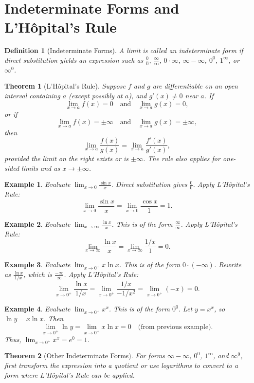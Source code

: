 \documentclass[11pt,a4paper]{article}
\newtheorem{example}{Example}
\newtheorem{theorem}{Theorem}
\newtheorem{definition}{Definition}
\begin{document}
\section{Indeterminate Forms and L'Hôpital's Rule}
\begin{definition}[Indeterminate Forms]
A limit is called an \textit{indeterminate form} if direct substitution yields an expression such as $\frac{0}{0}$, $\frac{\infty}{\infty}$, $0 \cdot \infty$, $\infty - \infty$, $0^0$, $1^\infty$, or $\infty^0$.
\end{definition}
\begin{theorem}[L'Hôpital's Rule]
Suppose $f$ and $g$ are differentiable on an open interval containing $a$ (except possibly at $a$), and $g'(x) \neq 0$ near $a$. If
\[
\lim_{x \to a} f(x) = 0 \quad \text{and} \quad \lim_{x \to a} g(x) = 0,
\]
or if
\[
\lim_{x \to a} f(x) = \pm\infty \quad \text{and} \quad \lim_{x \to a} g(x) = \pm\infty,
\]
then
\[
\lim_{x \to a} \frac{f(x)}{g(x)} = \lim_{x \to a} \frac{f'(x)}{g'(x)},
\]
provided the limit on the right exists or is $\pm\infty$. The rule also applies for one-sided limits and as $x \to \pm\infty$.
\end{theorem}
\begin{example}
Evaluate $\displaystyle \lim_{x \to 0} \frac{\sin x}{x}$.
Direct substitution gives $\frac{0}{0}$. Apply L'Hôpital's Rule:
\[
\lim_{x \to 0} \frac{\sin x}{x} = \lim_{x \to 0} \frac{\cos x}{1} = 1.
\]
\end{example}
\begin{example}
Evaluate $\displaystyle \lim_{x \to \infty} \frac{\ln x}{x}$.
This is of the form $\frac{\infty}{\infty}$. Apply L'Hôpital's Rule:
\[
\lim_{x \to \infty} \frac{\ln x}{x} = \lim_{x \to \infty} \frac{1/x}{1} = 0.
\]
\end{example}
\begin{example}
Evaluate $\displaystyle \lim_{x \to 0^+} x \ln x$.
This is of the form $0 \cdot (-\infty)$. Rewrite as $\frac{\ln x}{1/x}$, which is $\frac{-\infty}{\infty}$. Apply L'Hôpital's Rule:
\[
\lim_{x \to 0^+} \frac{\ln x}{1/x} = \lim_{x \to 0^+} \frac{1/x}{-1/x^2} = \lim_{x \to 0^+} (-x) = 0.
\]
\end{example}
\begin{example}
Evaluate $\displaystyle \lim_{x \to 0^+} x^x$.
This is of the form $0^0$. Let $y = x^x$, so $\ln y = x \ln x$. Then
\[
\lim_{x \to 0^+} \ln y = \lim_{x \to 0^+} x \ln x = 0 \quad \text{(from previous example)}.
\]
Thus, $\lim_{x \to 0^+} x^x = e^0 = 1$.
\end{example}
\begin{theorem}[Other Indeterminate Forms]
For forms $\infty - \infty$, $0^0$, $1^\infty$, and $\infty^0$, first transform the expression into a quotient or use logarithms to convert to a form where L'Hôpital's Rule can be applied.
\end{theorem}
\end{document}
